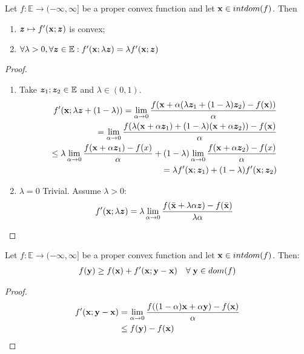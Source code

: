 \documentclass[11pt]{article}
\begin{document}
\begin{lemma}
    Let $f: \mathbb{E} \to (-\infty,\infty]$ be a proper convex function and let ${\mathbf{x}} \in intdom(f)$. Then
    \begin{enumerate}
        \item ${\bm{z}} \mapsto f'({\mathbf{x}};{\bm{z}})$ is convex;
        \item $\forall \lambda > 0, \forall {\bm{z}} \in \mathbb{E}: f'({\mathbf{x}};\lambda {\bm{z}}) = \lambda f'({\mathbf{x}};{\bm{z}})$
    \end{enumerate}
\end{lemma}
\begin{proof}
    \begin{enumerate}
        \item Take ${\bm{z}}_1;{\bm{z}}_2 \in \mathbb{E}$ and $\lambda \in (0,1)$.
        \begin{align*}
            f'({\mathbf{x}};\lambda {\bm{z}} + (1-\lambda)) = \lim_{\alpha \to 0} \frac{
                f({\mathbf{x}} + \alpha (\lambda {\bm{z}}_1 + (1-\lambda){\bm{z}}_2) - f({\mathbf{x}}))
            }{\alpha}\\
            = \lim_{\alpha \to 0} \frac{f(\lambda({\mathbf{x}} + \alpha {\bm{z}}_1) + (1-\lambda)({\mathbf{x}} + \alpha {\bm{z}}_2))
            - f({\mathbf{x}})}{\alpha}\\
            \le \lambda \lim_{\alpha \to 0} \frac{f({\mathbf{x}} + \alpha {\bm{z}}_1 ) - f(x)}{\alpha} 
            + (1-\lambda) \lim_{\alpha \to 0} \frac{f({\mathbf{x}} + \alpha {\bm{z}}_2 ) - f(x)}{\alpha} \\
            = \lambda f'({\mathbf{x}}; {\bm{z}}_1) + (1-\lambda)f'({\mathbf{x}};{\bm{z}}_2)
        \end{align*}
        \item $\lambda = 0$ Trivial. Assume $\lambda > 0$:
        \begin{align*}
            f'({\mathbf{x}};\lambda{\bm{z}}) = \lambda 
            \lim_{\alpha \to 0} \frac{f(\bar{{\mathbf{x}}}+\lambda\alpha {\bm{z}}) - f(\bar{{\mathbf{x}}})}{\lambda\alpha}
        \end{align*}
    \end{enumerate}
\end{proof}

\begin{lemma}
    Let $f: \mathbb{E} \to (-\infty, \infty]$ be a proper convex function and let
    ${\mathbf{x}} \in intdom(f)$. Then:
    \begin{align*}
        f({\mathbf{y}}) \ge f({\mathbf{x}}) + f'({\mathbf{x}};{\mathbf{y}} - {\mathbf{x}}) \quad \forall\; {\mathbf{y}} \in dom(f)
    \end{align*}
\end{lemma}

\begin{proof}
    \begin{align*}
        f'({\mathbf{x}}; {\mathbf{y}} - {\mathbf{x}}) &= \lim_{\alpha \to 0} \frac{f((1-\alpha){\mathbf{x}} + \alpha{\mathbf{y}}) - f({\mathbf{x}})}{\alpha}\\
    &\le f({\mathbf{y}}) - f({\mathbf{x}})
    \end{align*}
\end{proof}
\end{document}
